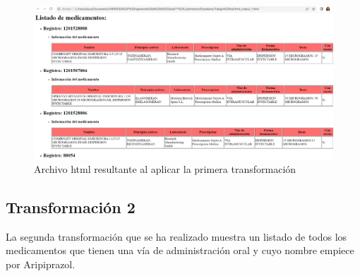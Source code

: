 \documentclass[../main.tex]{subfiles}
\begin{document}
\begin{figure}[h]
    \centering
    \includegraphics[scale=0.3]{images/html_output1.PNG}
    \caption{Archivo html resultante al aplicar la primera transformación}
    \label{fig:mesh1}
\end{figure}



\subsection{Transformación 2}
La segunda transformación que se ha realizado muestra un listado de todos los medicamentos que tienen una vía de administración oral y cuyo nombre empiece por Aripiprazol.
\end{document}

